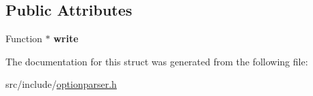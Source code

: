 \subsection*{Public Attributes}
\begin{DoxyCompactItemize}
\item 
\hypertarget{structxmem_1_1config_1_1third__party_1_1_print_usage_implementation_1_1_function_writer_a15527210bafed3bf8accf1071a2ed710}{}Function $\ast$ {\bfseries write}\label{structxmem_1_1config_1_1third__party_1_1_print_usage_implementation_1_1_function_writer_a15527210bafed3bf8accf1071a2ed710}

\end{DoxyCompactItemize}


The documentation for this struct was generated from the following file\+:\begin{DoxyCompactItemize}
\item 
src/include/\hyperlink{optionparser_8h}{optionparser.\+h}\end{DoxyCompactItemize}
